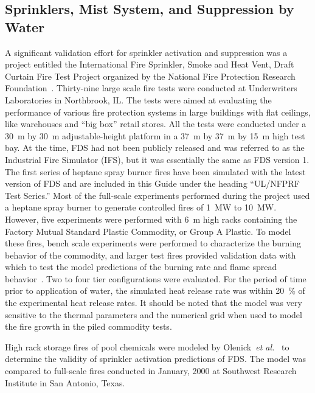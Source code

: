 \subsection{Sprinklers, Mist System, and Suppression by Water}

A   significant  validation  effort   for  sprinkler   activation  and suppression was  a project entitled the  International Fire Sprinkler, Smoke
and Heat Vent, Draft  Curtain Fire Test Project organized by the National   Fire  Protection   Research  Foundation~\cite{McGrattan:5}. Thirty-nine
large scale  fire  tests were  conducted at  Underwriters Laboratories in  Northbrook, IL.  The  tests were aimed  at evaluating the performance of
various  fire protection systems in large buildings with  flat ceilings, like  warehouses and  ``big box''  retail stores. All the  tests were
conducted  under a 30~m by  30~m adjustable-height platform in a 37~m by 37~m by 15~m high test bay. At the time, FDS had not been publicly released
and  was referred to as the Industrial Fire Simulator (IFS), but it was essentially the same as FDS version 1. The first series of heptane spray burner
fires have been simulated with the latest version of FDS and are included in this Guide under the heading ``UL/NFPRF Test Series.''
Most of the full-scale experiments performed during the project used a heptane  spray  burner  to   generate  controlled  fires  of  1~MW  to 10~MW.
However, five  experiments  were performed  with  6~m high  racks containing the  Factory Mutual Standard Plastic Commodity,  or Group A Plastic. To
model these  fires, bench scale experiments were performed to characterize the burning behavior of the commodity, and larger test fires  provided
validation  data  with  which  to   test  the  model predictions    of    the     burning    rate    and    flame    spread
behavior~\cite{Hamins:1,Hamins:IAFSS2002}.     Two   to    four   tier configurations  were  evaluated.  For  the  period  of  time prior  to
application of water, the simulated heat release rate was within 20~\% of the experimental  heat release rates.  It should  be noted that the model
was very  sensitive to the thermal parameters  and the numerical grid when used to model the fire growth in the piled commodity tests.


High rack storage fires of pool chemicals were modeled by Olenick~{\em et  al.}~\cite{Olenick:1}  to  determine  the  validity  of  sprinkler
activation predictions  of FDS.  The model was  compared to full-scale fires conducted  in January, 2000  at Southwest Research  Institute in San
Antonio,  Texas.

